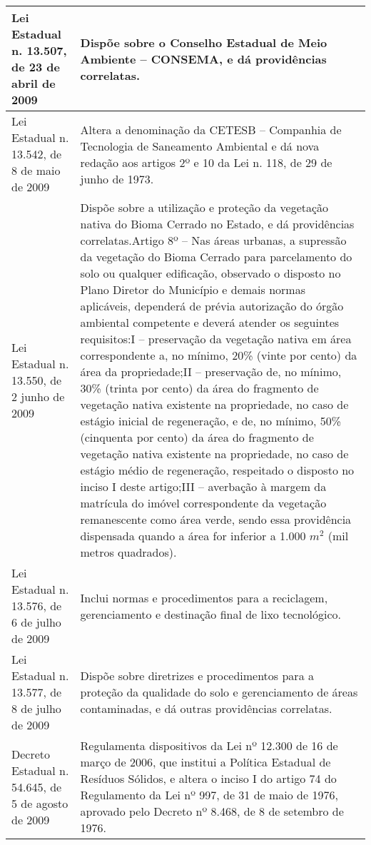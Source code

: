 \begin{center}
\begin{longtable}{|p{}|p{}|}
			\hline
			Lei  Estadual  n.  13.507,  de  23 de abril de 2009 & Dispõe  sobre  o  Conselho  Estadual  de  Meio  Ambiente  –  CONSEMA,  e  dá providências correlatas. \\
			\hline
			Lei Estadual n. 13.542, de 8 de maio de 2009 & Altera a denominação da CETESB – Companhia de Tecnologia de Saneamento Ambiental e dá nova redação aos artigos 2º e 10 da Lei n. 118, de 29 de junho de 1973. \\
			\hline
			Lei  Estadual  n.  13.550,  de  2 junho de 2009 & Dispõe sobre a utilização e proteção da vegetação nativa do Bioma Cerrado no Estado, e dá providências correlatas.\newline{}Artigo  8º  –  Nas  áreas  urbanas,  a  supressão  da  vegetação  do  Bioma  Cerrado para  parcelamento  do  solo  ou  qualquer  edificação,  observado  o  disposto  no Plano  Diretor  do  Município  e  demais  normas  aplicáveis,  dependerá  de  prévia autorização  do  órgão  ambiental  competente  e  deverá  atender  os  seguintes requisitos:\newline{}I  –  preservação  da  vegetação  nativa  em  área  correspondente  a,  no  mínimo, 20\% (vinte por cento) da área da propriedade;\newline{}II – preservação de, no mínimo, 30\% (trinta por cento) da área do fragmento de vegetação  nativa  existente  na  propriedade,  no  caso  de  estágio  inicial  de regeneração, e de, no mínimo, 50\% (cinquenta por cento) da área do fragmento de  vegetação  nativa  existente  na  propriedade,  no  caso  de  estágio  médio  de regeneração, respeitado o disposto no inciso I deste artigo;\newline{}III – averbação à margem da matrícula do imóvel correspondente da vegetação remanescente como área verde, sendo essa providência dispensada  quando a área for inferior a 1.000 $m^2$ (mil metros quadrados). \\
			\hline
			Lei Estadual n. 13.576, de 6 de julho de 2009 & Inclui normas e procedimentos para a reciclagem, gerenciamento e destinação final de lixo tecnológico. \\
			\hline
			Lei Estadual n. 13.577, de 8 de julho de 2009 & Dispõe sobre diretrizes e procedimentos para a proteção da qualidade do solo e gerenciamento de áreas contaminadas, e dá outras providências correlatas. \\
			\hline
			Decreto Estadual n. 54.645, de 5 de agosto de 2009 & Regulamenta dispositivos da Lei nº 12.300 de 16 de março de 2006, que institui a  Política  Estadual  de  Resíduos  Sólidos,  e  altera  o  inciso  I  do  artigo  74  do Regulamento da Lei nº 997, de 31 de maio de 1976, aprovado pelo Decreto nº 8.468, de 8 de setembro de 1976. \\

\end{longtable}
\end{center}
